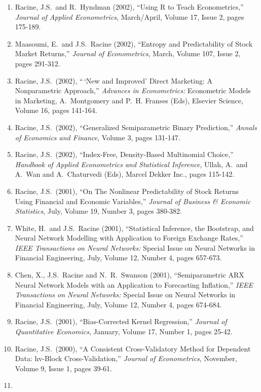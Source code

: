 \documentclass[
]{article}
\begin{document}
\begin{enumerate}
  Issue 2, pages 293-302.
\item
  Racine, J.S.~and R.~Hyndman (2002), ``Using R to Teach Econometrics,''
  \emph{Journal of Applied Econometrics}, March/April, Volume 17, Issue
  2, pages 175-189.
\item
  Maasoumi, E.~and J.S.~Racine (2002), ``Entropy and Predictability of
  Stock Market Returns,'' \emph{Journal of Econometrics}, March, Volume
  107, Issue 2, pages 291-312.
\item
  Racine, J.S.~(2002), ``\,`New and Improved' Direct Marketing: A
  Nonparametric Approach,'' \emph{Advances in Econometrics:} Econometric
  Models in Marketing, A.~Montgomery and P.~H. Franses (Eds), Elsevier
  Science, Volume 16, pages 141-164.
\item
  Racine, J.S.~(2002), ``Generalized Semiparametric Binary Prediction,''
  \emph{Annals of Economics and Finance}, Volume 3, pages 131-147.
\item
  Racine, J.S.~(2002), ``Index-Free, Density-Based Multinomial Choice,''
  \emph{Handbook of Applied Econometrics and Statistical Inference},
  Ullah, A.~and A.~Wan and A.~Chaturvedi (Eds), Marcel Dekker Inc.,
  pages 115-142.
\item
  Racine, J.S.~(2001), ``On The Nonlinear Predictability of Stock
  Returns Using Financial and Economic Variables,'' \emph{Journal of
  Business \& Economic Statistics}, July, Volume 19, Number 3, pages
  380-382.
\item
  White, H.~and J.S.~Racine (2001), ``Statistical Inference, the
  Bootstrap, and Neural Network Modelling with Application to Foreign
  Exchange Rates,'' \emph{IEEE Transactions on Neural Networks:} Special
  Issue on Neural Networks in Financial Engineering, July, Volume 12,
  Number 4, pages 657-673.
\item
  Chen, X., J.S.~Racine and N.~R.~Swanson (2001), ``Semiparametric ARX
  Neural Network Models with an Application to Forecasting Inflation,''
  \emph{IEEE Transactions on Neural Networks:} Special Issue on Neural
  Networks in Financial Engineering, July, Volume 12, Number 4, pages
  674-684.
\item
  Racine, J.S.~(2001), ``Bias-Corrected Kernel Regression,''
  \emph{Journal of Quantitative Economics}, January, Volume 17, Number
  1, pages 25-42.
\item
  Racine, J.S.~(2000), ``A Consistent Cross-Validatory Method for
  Dependent Data: hv-Block Cross-Validation,'' \emph{Journal of
  Econometrics}, November, Volume 9, Issue 1, pages 39-61.
\item

\end{enumerate}
\end{document}
